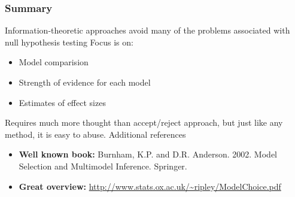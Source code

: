 \documentclass[color=usenames,dvipsnames]{beamer}\usepackage[]{graphicx}\usepackage[]{color}
\begin{document}
\begin{frame}
  \frametitle{Summary}
    Information-theoretic approaches avoid many of the problems
      associated with null hypothesis testing
    \pause
    \vfill
    Focus is on:
      \begin{itemize}
        \large
        \item Model comparision
        \item Strength of evidence for each model
        \item Estimates of effect sizes
      \end{itemize}
    \pause
    \vfill
    Requires much more thought than accept/reject approach, but just
    like any method, it is easy to abuse. 
  \pause
  \vfill
  Additional references
  \begin{itemize}
    \item[] {\bf Well known book:} Burnham, K.P. and
      D.R. Anderson. 2002. Model Selection and 
      Multimodel Inference. Springer.
    \item[] {\bf Great overview:} \url{http://www.stats.ox.ac.uk/~ripley/ModelChoice.pdf} 
  \end{itemize}
\end{frame}
\end{document}
